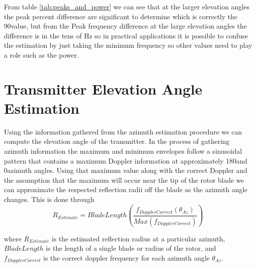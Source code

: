 From table \ref{tab:peaks_and_power} we can see that at the larger elevation angles the peak percent difference are significant to determine which is correctly the 90\textdegree value, but from the Peak frequency difference at the large elevation angles the difference is in the tens of Hz so in practical applications it is possible to confuse the estimation by just taking the minimum frequency so other values need to play a role such as the power.


\section{Transmitter Elevation Angle Estimation} \label{sec:transmitter_elevation_angle_estimation}
Using the information gathered from the azimuth estimation procedure we can compute the elevation angle of the transmitter. In the process of gathering azimuth information the maximum and minimum envelopes follow a sinusoidal pattern that contains a maximum Doppler information at approximately 180\textdegree \space and 0\textdegree \space azimuth angles. Using that maximum value along with the correct Doppler and the assumption that the maximum will occur near the tip of the rotor blade we can approximate the respected reflection radii off the blade as the azimuth angle changes. This is done through 
\begin{equation}
	R_{Estimate} = BladeLength \left(\frac{f_{DopplerCorrect}(\theta_{Az})}{Max(f_{DopplerCorrect})}\right)
	\label{eqn:r_estimate}
\end{equation}

where $R_{Estimate}$ is the estimated reflection radius at a particular azimuth, $BladeLength$ is the length of a single blade or radius of the rotor, and $f_{DopplerCorrect}$ is the correct doppler frequency for each azimuth angle $\theta_{Az}$.

